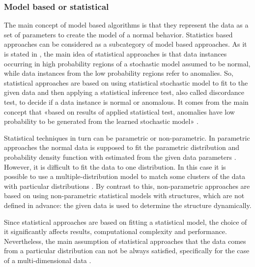\subsubsection{Model based \cite{article:6_survey_anom_det_rtuvs}\cite{inproceedings:18_ardod_lstd} or statistical \cite{article:15_survey_ad}}
The main concept of model based algorithms is that they represent the data as a set of parameters to create the model of a normal behavior. Statistics based approaches can be considered as a subcategory of model based approaches. As it is stated in \cite{article:15_survey_ad}, the main idea of statistical approaches is that data instances occurring in high probability regions of a stochastic model assumed to be normal, while data instances from the low probability regions refer to anomalies. So, statistical approaches are based on using statistical stochastic model to fit to the given data and then applying a statistical inference test, also called discordance test, to decide if a data instance is normal or anomalous. It comes from the main concept that «based on results of applied statistical test, anomalies have low probability to be generated from the learned stochastic model» \cite{article:15_survey_ad}.

Statistical techniques in turn can be parametric or non-parametric. In parametric approaches the normal data is supposed to fit the parametric distribution and probability density function with estimated from the given data parameters \cite{article:6_survey_anom_det_rtuvs}. However, it is difficult to fit the data to one distribution. In this case it is possible to use a multiple-distribution model to match some clusters of the data with particular distributions \cite{inproceedings:18_ardod_lstd}. By contrast to this, non-parametric approaches are based on using non-parametric statistical models with structures, which are not defined in advance: the given data is used to determine the structure dynamically.

Since statistical approaches are based on fitting a statistical model, the choice of it significantly affects results, computational complexity and performance. Nevertheless, the main assumption of statistical approaches that the data comes from a particular distribution can not be always satisfied, specifically for the case of a multi-dimensional data \cite{article:15_survey_ad}.

